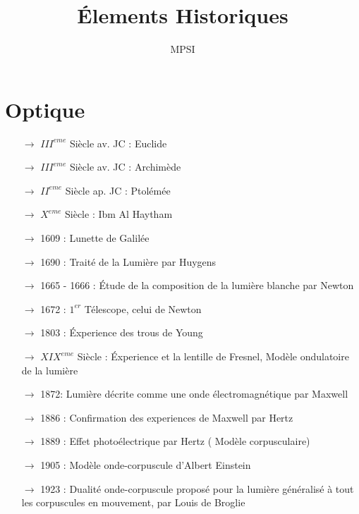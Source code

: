 \documentclass[a4paper,12pt]{report}
\title{Élements Historiques}
\author{MPSI}
\begin{document}
\maketitle
\tableofcontents
\chapter{Optique}
\begin{itemize}
 \item[$\rightarrow$] $III^{eme}$ Siècle av. JC : Euclide
 \item[$\rightarrow$] $III^{eme}$ Siècle av. JC : Archimède
 \item[$\rightarrow$] $II^{eme}$ Siècle ap. JC : Ptolémée
 \item[$\rightarrow$] $X^{eme}$ Siècle : Ibm Al Haytham
 \item[$\rightarrow$] 1609 : Lunette de Galilée
 \item[$\rightarrow$] 1690 : Traité de la Lumière par Huygens
 \item[$\rightarrow$] 1665 - 1666 : Étude de la composition de la lumière blanche par Newton
 \item[$\rightarrow$] 1672 : $1^{er}$ Télescope, celui de Newton
 \item[$\rightarrow$] 1803 : Éxperience des trous de Young
 \item[$\rightarrow$] $XIX^{eme}$ Siècle : Éxperience et la lentille de Fresnel, Modèle ondulatoire de la lumière
\item[$\rightarrow$] 1872: Lumière décrite comme une onde électromagnétique par Maxwell
\item[$\rightarrow$] 1886 : Confirmation des experiences de Maxwell par Hertz
\item[$\rightarrow$] 1889 : Effet photoélectrique par Hertz ( Modèle corpusculaire)
\item[$\rightarrow$] 1905 : Modèle onde-corpuscule d'Albert Einstein 
\item[$\rightarrow$] 1923 : Dualité onde-corpuscule proposé pour la lumière généralisé à tout les corpuscules en mouvement, par Louis de Broglie
\end{itemize}
\end{document}
